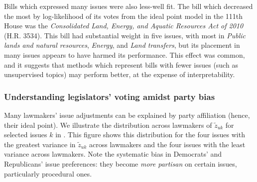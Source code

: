Bills which expressed many issues were also less-well fit.  The bill
which decreased the most by log-likelihood of its votes from the ideal
point model in the 111th House was the \emph{Consolidated Land,
  Energy, and Aquatic Resources Act of 2010} (H.R. 3534).  This bill
had substantial weight in five issues, with most in \emph{Public lands
  and natural resources}, \emph{Energy}, and \emph{Land transfers},
but its placement in many issues appears to have harmed its
performance.  This effect was common, and it suggests that methods
which represent bills with fewer issues (such as unsupervised topics)
may perform better, at the expense of interpretability.

\subsubsection{Understanding legislators' voting amidst party bias}
\label{sec:party_bias}
Many lawmakers' issue adjustments can be explained by party
affiliation (hence, their ideal point).  We illustrate the
distribution across lawmakers of $\tilde z_{uk}$ for selected issues
$k$ in .  This figure shows this
distribution for the four issues with the greatest variance in $\tilde
z_{uk}$ across lawmakers and the four issues with the least variance
across lawmakers. Note the systematic bias in Democrats' and
Republicans' issue preferences: they become \emph{more partisan} on
certain issues, particularly procedural ones.

